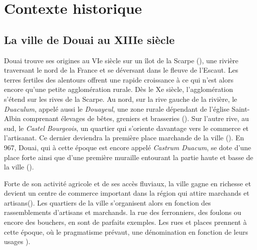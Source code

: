 
\section{Contexte historique}
\subsection{La ville de Douai au XIIIe siècle}

Douai trouve ses origines au VIe siècle sur un îlot de la Scarpe (\cite{mestayer_douai_2016}), une rivière traversant le nord de la France et se déversant dans le fleuve de l'Escaut. Les terres fertiles des alentours offrent une rapide croissance à ce qui n'est alors encore qu'une petite agglomération rurale. Dès le Xe siècle, l'agglomération s'étend sur les rives de la Scarpe. Au nord, sur la rive gauche de la rivière, le \textit{Duaculum}, appelé aussi le \textit{Douayeul}, une zone rurale dépendant de l'église Saint-Albin comprenant élevages de bêtes, greniers et brasseries (\cite{mestayer_douai_2016}). Sur l'autre rive, au sud, le \textit{Castel Bourgeois}, un quartier qui s'oriente davantage vers le commerce et l'artisanat. Ce dernier deviendra la première place marchande de la ville (\cite{netteghem_histoire_2021}). En 967, Douai, qui à cette époque est encore appelé \textit{Castrum Duacum}, se dote d'une place forte ainsi que d'une première muraille entourant la partie haute et basse de la ville (\cite{mestayer_douai_2016}). 

Forte de son activité agricole et de ses accès fluviaux, la ville gagne en richesse et devient un centre de commerce important dans la région qui attire marchands et artisans(\cite{clisant_vie_2003}). Les quartiers de la ville s'organisent alors en fonction des rassemblements d'artisans et marchands. la rue des ferronniers, des foulons ou encore des bouchers, en sont de parfaits exemples. Les rues et places prennent à cette époque, où le pragmatisme prévaut, une dénomination en fonction de leurs usages \cite{colin_decouvrez_2001}). 

